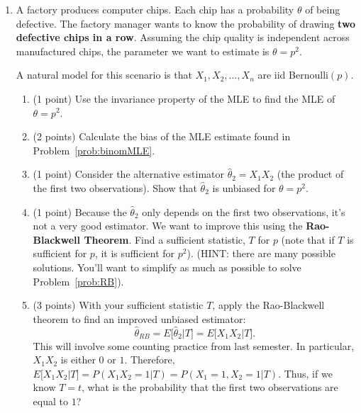 \documentclass[10pt,twoside]{article}\usepackage[]{graphicx}\usepackage[dvipsnames,svgnames,table]{xcolor}
\begin{document}
\begin{enumerate}
\item A factory produces computer chips. Each chip has a probability $\theta$ of being defective. The factory manager wants to know the probability of drawing \textbf{two defective chips in a row}.
Assuming the chip quality is independent across manufactured chips, the parameter we want to estimate is $\theta = p^2$.

A natural model for this scenario is that $X_1, X_2, \ldots, X_n$ are iid Bernoulli$(p)$.

\begin{enumerate}
  \item (1 point) \label{prob:binomMLE} Use the invariance property of the MLE to find the MLE of $\theta = p^2$.
  \item (2 points) Calculate the bias of the MLE estimate found in Problem~\ref{prob:binomMLE}.
  \item (1 point) Consider the alternative estimator $\hat{\theta}_2 = X_1X_2$ (the product of the first two observations). Show that $\hat{\theta}_2$ is unbiased for $\theta = p^2$.
  \item (1 point) Because the $\hat{\theta}_2$ only depends on the first two observations, it's not a very good estimator. We want to improve this using the \textbf{Rao-Blackwell Theorem}. Find a sufficient statistic, $T$ for $p$ (note that if $T$ is sufficient for $p$, it is sufficient for $p^2$). (HINT: there are many possible solutions. You'll want to simplify as much as possible to solve Problem~\ref{prob:RB}).
  \item (3 points) \label{prob:RB} With your sufficient statistic $T$, apply the Rao-Blackwell theorem to find an improved unbiased estimator:
  $$
  \hat{\theta}_{RB} = E\big[ \hat{\theta}_2 | T\big] = E\big[ X_1X_2 | T\big].
  $$
  This will involve some counting practice from last semester. In particular, $X_1X_2$ is either $0$ or $1$. Therefore, $E\big[ X_1X_2 | T\big] = P(X_1X_2 = 1 | T) = P(X_1 = 1, X_2 = 1 | T)$. Thus, if we know $T = t$, what is the probability that the first two observations are equal to $1$?
\end{enumerate}


\end{enumerate}
\end{document}
